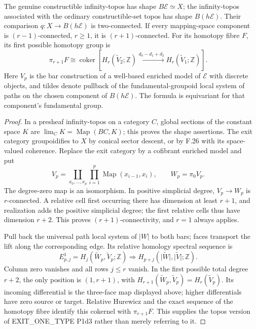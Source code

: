 The genuine constructible infinity-topos has shape
$B\mathcal E\simeq X$; the infinity-topos associated with the
ordinary constructible-set topos has shape $B(h\mathcal E)$.
Their comparison
$q:X\to B(h\mathcal E)$ is two-connected. If every mapping-space
component is $(r-1)$-connected, $r\geq1$, it is $(r+1)$-connected.
For its homotopy fibre $F$, its first possible homotopy group is
\[
 \pi_{r+1}F\cong
 \operatorname{coker}\left[
 H_r(\widetilde V_2;\mathbb Z)
 \xrightarrow{d_0-d_1+d_2}H_r(\widetilde V_1;\mathbb Z)\right].
\]
Here $V_p$ is the bar construction of a well-based enriched model
of $\mathcal E$ with discrete objects, and tildes denote pullback of
the fundamental-groupoid local system of paths on the chosen
component of $B(h\mathcal E)$. The formula is equivariant for that
component's fundamental group.

\begin{proof}
In a presheaf infinity-topos on a category $C$, global sections of
the constant space $K$ are $\lim_CK=\operatorname{Map}(BC,K)$;
this proves the shape assertions. The exit category groupoidifies to
$X$ by conical sector descent, or by F.26 with its space-valued
coherence. Replace the exit category by a cofibrant enriched model
and put
\[
 V_p=\coprod_{x_0,\ldots,x_p}
 \prod_{i=1}^p\operatorname{Map}(x_{i-1},x_i),\qquad W_p=\pi_0V_p.
\]
The degree-zero map is an isomorphism. In positive simplicial degree,
$V_p\to W_p$ is $r$-connected. A relative cell first occurring there
has dimension at least $r+1$, and realization adds the positive
simplicial degree; the first relative cells thus have dimension
$r+2$. This proves $(r+1)$-connectivity, and $r=1$ always applies.

Pull back the universal path local system of $|W|$ to both bars;
faces transport the lift along the corresponding edge. Its relative
homology spectral sequence is
\[
 E^1_{p,j}=H_j(\widetilde W_p,\widetilde V_p;\mathbb Z)
 \Longrightarrow H_{p+j}(\widetilde{|W|},\widetilde{|V|};\mathbb Z).
\]
Column zero vanishes and all rows $j\leq r$ vanish. In the first
possible total degree $r+2$, the only position is $(1,r+1)$,
with $H_{r+1}(\widetilde W_p,\widetilde V_p)=H_r(\widetilde V_p)$.
Its incoming differential is the three-face map displayed above;
higher differentials have zero source or target. Relative Hurewicz
and the exact sequence of the homotopy fibre identify this cokernel
with $\pi_{r+1}F$. This supplies the topos version of
EXIT\_ONE\_TYPE P1d3 rather than merely referring to it.
\end{proof}


